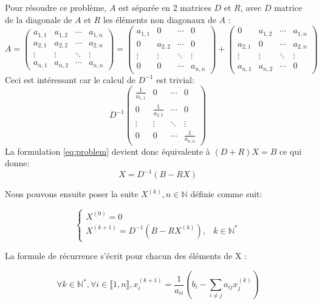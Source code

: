 \documentclass[11pt, a4paper]{article}
\begin{document}
Pour résoudre ce problème, $A$ est séparée en 2 matrices $D$ et $R$, avec $D$ matrice de la diagonale de $A$ et $R$ les éléments non diagonaux de $A$ :
\[
A =
 \begin{pmatrix}
  a_{1,1} & a_{1,2} & \cdots & a_{1,n} \\
  a_{2,1} & a_{2,2} & \cdots & a_{2,n} \\
  \vdots  & \vdots  & \ddots & \vdots  \\
  a_{n,1} & a_{n,2} & \cdots & a_{n,n}
 \end{pmatrix}
 =
  \begin{pmatrix}
  a_{1,1} & 0 & \cdots & 0 \\
  0 & a_{2,2} & \cdots & 0 \\
  \vdots  & \vdots  & \ddots & \vdots  \\
  0 & 0 & \cdots & a_{n,n}
 \end{pmatrix}
 +
  \begin{pmatrix}
  0 & a_{1,2} & \cdots & a_{1,n} \\
  a_{2,1} & 0 & \cdots & a_{2,n} \\
  \vdots  & \vdots  & \ddots & \vdots  \\
  a_{n,1} & a_{n,2} & \cdots & 0
 \end{pmatrix}
\]
Ceci est intéressant car le calcul de $D^{-1}$ est trivial:
\[
D^{-1}
  \begin{pmatrix}
  \frac{1}{a_{1,1}} & 0 & \cdots & 0 \\
  0 & \frac{1}{a_{2,2}} & \cdots & 0 \\
  \vdots  & \vdots  & \ddots & \vdots  \\
  0 & 0 & \cdots & \frac{1}{a_{n,n}}
 \end{pmatrix}
\]
La formulation \eqref{eq:problem} devient donc équivalente à \((D+R)X=B\)
ce qui donne:
\begin{equation} \label{eq:reeq}
    X = D^{-1} (B-RX)
\end{equation}

Nous pouvons ensuite poser la suite $X^{(k)}, n \in \mathds{N}$ définie comme suit:

\[
\left\{
    \begin{array}{lr}
        X^{(0)} = 0 \\
        X^{(k+1)} = D^{-1} (B-RX^{(k)}),& k \in \mathds{N}^*
    \end{array}
\right.
\]

La formule de récurrence s'écrit pour chacun des éléments de X :

\begin{equation}
    \forall k \in \mathds{N}^*, \forall i \in \llbracket 1,n \rrbracket,
    x^{(k+1)}_i = \frac{1}{a_{ii}} (b_i - \sum_{i \neq j} a_{ij}x^{(k)}_j)
\end{equation}
\end{document}
